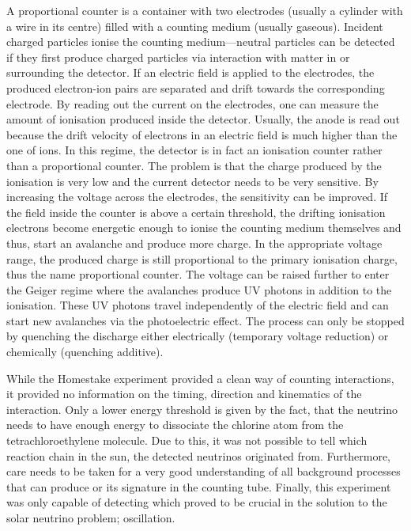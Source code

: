 A proportional counter is a container with two electrodes (usually a cylinder with a wire in its centre) filled with a counting medium (usually gaseous).
Incident charged particles ionise the counting medium---neutral particles can be detected if they first produce charged particles via interaction with matter in or surrounding the detector.
If an electric field is applied to the electrodes, the produced electron-ion pairs are separated and drift towards the corresponding electrode.
By reading out the current on the electrodes, one can measure the amount of ionisation produced inside the detector.
Usually, the anode is read out because the drift velocity of electrons in an electric field is much higher than the one of ions.
In this regime, the detector is in fact an ionisation counter rather than a proportional counter.
The problem is that the charge produced by the ionisation is very low and the current detector needs to be very sensitive.
By increasing the voltage across the electrodes, the sensitivity can be improved.
If the field inside the counter is above a certain threshold, the drifting ionisation electrons become energetic enough to ionise the counting medium themselves and thus, start an avalanche and produce more charge.
In the appropriate voltage range, the produced charge is still proportional to the primary ionisation charge, thus the name proportional counter.
The voltage can be raised further to enter the Geiger regime where the avalanches produce UV photons in addition to the ionisation.
These UV photons travel independently of the electric field and can start new avalanches via the photoelectric effect.
The process can only be stopped by quenching the discharge either electrically (temporary voltage reduction) or chemically (quenching additive).

While the Homestake experiment provided a clean way of counting \Pgne interactions, it provided no information on the timing, direction and kinematics of the interaction.
Only a lower energy threshold is given by the fact, that the neutrino needs to have enough energy to dissociate the chlorine atom from the tetrachloroethylene molecule.
Due to this, it was not possible to tell which reaction chain in the sun, the detected neutrinos originated from.
Furthermore, care needs to be taken for a very good understanding of all background processes that can produce  or its signature in the counting tube.
Finally, this experiment was only capable of detecting \Pgne which proved to be crucial in the solution to the solar neutrino problem; oscillation.

